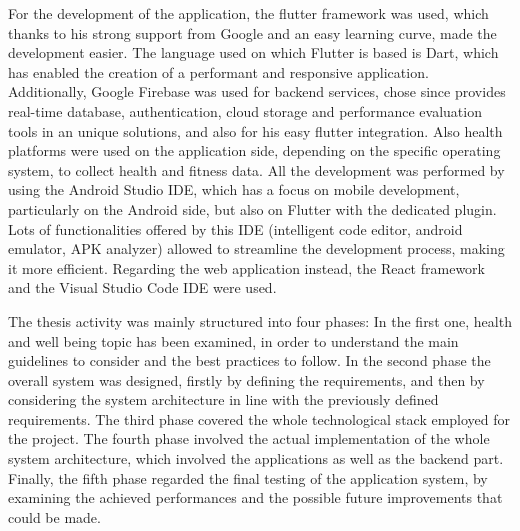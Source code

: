 \noindent For the development of the application, the flutter framework was used, which thanks to his strong support from Google and an easy learning curve, made the development easier. The language used on which Flutter is based is Dart, which has enabled the creation of a performant and responsive application. Additionally, Google Firebase was used for backend services, chose since provides real-time database, authentication, cloud storage and performance evaluation tools in an unique solutions, and also for his easy flutter integration. Also health platforms were used on the application side, depending on the specific operating system, to collect health and fitness data. All the development was performed by using the Android Studio IDE, which has a focus on mobile development, particularly on the Android side, but also on Flutter with the dedicated plugin. Lots of functionalities offered by this IDE (intelligent code editor, android emulator, APK analyzer) allowed to streamline the development process, making it more efficient. Regarding the web application instead, the React framework and the Visual Studio Code IDE were used.
\vspace{0.5ex}

\noindent The thesis activity was mainly structured into four phases: In the first one, health and well being topic has been examined, in order to understand the main guidelines to consider and the best practices to follow. In the second phase the overall system was designed, firstly by defining the requirements, and then by considering the system architecture in line with the previously defined requirements. The third phase covered the whole technological stack employed for the project. The fourth phase involved the actual implementation of the whole system architecture, which involved the applications as well as the backend part. Finally, the fifth phase regarded the final testing of the application system, by examining the achieved performances and the possible future improvements that could be made.